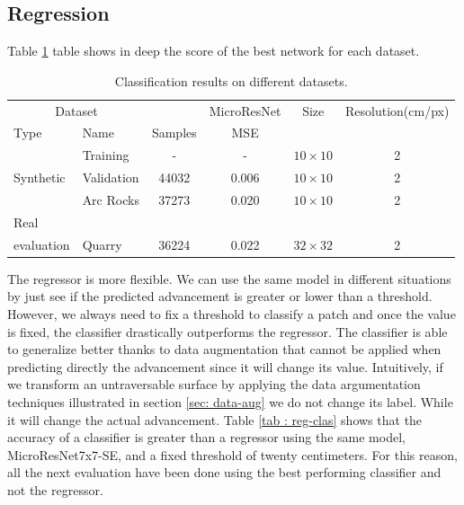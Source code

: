 \documentclass[../document.tex]{subfiles}
\begin{document}
\subsection{Regression}
Table \ref{tab : regression-results} table shows in deep the score of the best network for each dataset.
\begin{table}[htbp]
    \centering
    \begin{tabular}{@{}llcccc@{}}
    \toprule
    \multicolumn{2}{c}{Dataset} & & \multicolumn{1}{c}{MicroResNet} & Size & Resolution(cm/px) \\
    \cmidrule{1-2} \cmidrule{4-5}
    Type     &  Name  & Samples & MSE      & \\
    \toprule
      \multirow{3}{*}{Synthetic}  & Training  &  - & - &$10\times10$  & 2\\
      &  Validation   & 44032 &  0.006  &  $10\times10$ & 2 \\
      & Arc Rocks & 37273 & 0.020  &  $10\times10$& 2 \\
      \cmidrule{2-6}
    Real\\evaluation & Quarry & 36224 &  0.022 & $32\times32$ & 2\\
    \bottomrule   
\end{tabular}
\caption{Classification results on different datasets.}
\label{tab : regression-results}
\end{table}
The regressor is more flexible. We can use the same model in different situations by just see if the predicted advancement is greater or lower than a threshold. However, we always need to fix a threshold to classify a patch and once the value is fixed, the classifier drastically outperforms the regressor. The classifier is able to generalize better thanks to data augmentation that cannot be applied when predicting directly the advancement since it will change its value. Intuitively, if we transform an untraversable surface by applying the data argumentation techniques illustrated in section \ref{sec: data-aug} we do not change its label. While it will change the actual advancement. Table \ref{tab : reg-clas} shows that the accuracy of a classifier is greater than a regressor using the same model, MicroResNet7x7-SE, and a fixed threshold of twenty centimeters. For this reason, all the next evaluation have been done using the best performing classifier and not the regressor.
\end{document}
